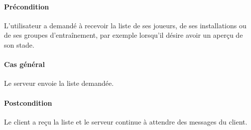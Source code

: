 	\paragraph{Précondition} L'utilisateur a demandé à recevoir la liste de ses joueurs, de ses installations ou de ses groupes d'entraînement, par exemple lorsqu'il désire avoir un aperçu de son stade.
    \paragraph{Cas général} Le \gls{serveur} envoie la liste demandée.
    \paragraph{Postcondition} Le \gls{client} a reçu la liste et le serveur continue à attendre des messages du client.
    